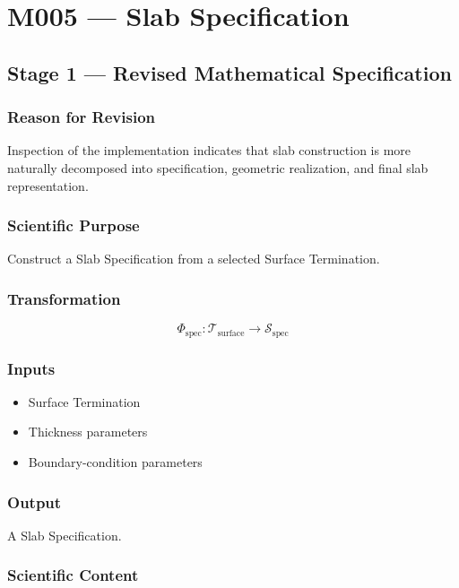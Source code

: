 \chapter{M005 --- Slab Specification}

\section{Stage 1 --- Revised Mathematical Specification}

\subsection{Reason for Revision}

Inspection of the implementation indicates that slab construction is more
naturally decomposed into specification, geometric realization, and
final slab representation.

\subsection{Scientific Purpose}

Construct a Slab Specification from a selected Surface Termination.

\subsection{Transformation}

\[
\Phi_{\mathrm{spec}}:
\mathcal{T}_{\mathrm{surface}}
\rightarrow
\mathcal{S}_{\mathrm{spec}}
\]

\subsection{Inputs}

\begin{itemize}
\item Surface Termination
\item Thickness parameters
\item Boundary-condition parameters
\end{itemize}

\subsection{Output}

A Slab Specification.

\subsection{Scientific Content}

